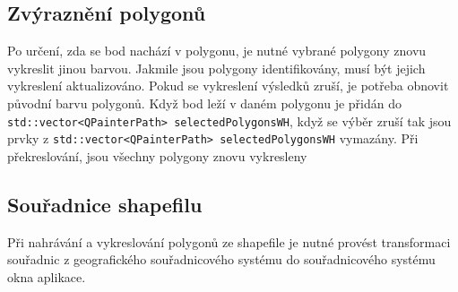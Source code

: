 \subsection{Zvýraznění polygonů}
Po určení, zda se bod nachází v polygonu, je nutné vybrané polygony znovu vykreslit jinou barvou. Jakmile jsou polygony identifikovány, musí být jejich vykreslení aktualizováno. Pokud se vykreslení výsledků zruší, je potřeba obnovit původní barvu polygonů. Když bod leží v daném polygonu je přidán do \texttt{std::vector<QPainterPath> selectedPolygonsWH}, když se výběr zruší tak jsou prvky z \newline \texttt{std::vector<QPainterPath> selectedPolygonsWH} vymazány. Při překreslování, jsou všechny polygony znovu vykresleny


\subsection{Souřadnice shapefilu}
Při nahrávání a vykreslování polygonů ze shapefile je nutné provést transformaci souřadnic z geografického souřadnicového systému do souřadnicového systému okna aplikace.

